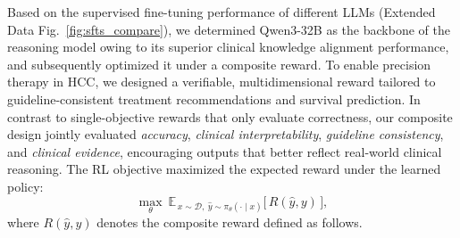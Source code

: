 \documentclass{article}
\begin{document}



Based on the supervised fine-tuning performance of different LLMs (Extended Data Fig.~\ref{fig:sfts_compare}), we determined Qwen3-32B as the backbone of the reasoning model owing to its superior clinical knowledge alignment performance, and subsequently optimized it under a composite reward.
To enable precision therapy in HCC, we designed a verifiable, multidimensional reward tailored to guideline-consistent treatment recommendations and survival prediction.
In contrast to single-objective rewards that only evaluate correctness, our composite design jointly evaluated \textit{accuracy}, \textit{clinical interpretability}, \textit{guideline consistency}, and \textit{clinical evidence}, encouraging outputs that better reflect real-world clinical reasoning. 
The RL objective maximized the expected reward under the learned policy:
\begin{equation}
\max_{\theta}\ \mathbb{E}_{\,x\sim\mathcal{D},\ \hat y\sim \pi_{\theta}(\cdot\mid x)}\big[\,R(\hat y, y)\,\big],
\label{eq:rl-objective}
\end{equation}
where $R(\hat y,y)$ denotes the composite reward defined as follows.
\end{document}
